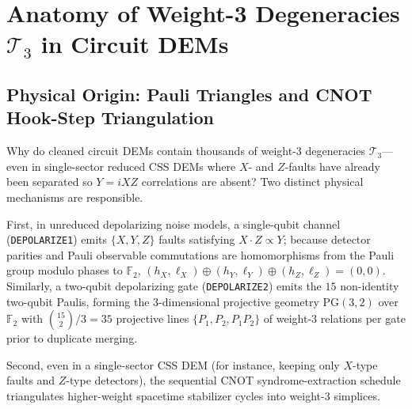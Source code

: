 \documentclass[12pt]{article}
\theoremstyle{definition}
\newcommand{\Ftwo}{\mathbb{F}_2}
\newcommand{\Tc}{\mathcal{T}_3}
\newcommand{\ttt}[1]{\texttt{#1}}
\begin{document}
\section{Anatomy of Weight-3 Degeneracies \texorpdfstring{$\Tc$}{T3} in Circuit DEMs}\label{sec:anatomy}

\subsection{Physical Origin: Pauli Triangles and CNOT Hook-Step Triangulation}\label{subsec:origin}

Why do cleaned circuit DEMs contain thousands of weight-3 degeneracies $\Tc$---even in single-sector reduced CSS
DEMs where $X$- and $Z$-faults have already been separated so $Y = iXZ$ correlations are absent? Two distinct
physical mechanisms are responsible.

First, in unreduced depolarizing noise models, a single-qubit channel (\ttt{DEPOLARIZE1}) emits $\{X, Y,
Z\}$ faults satisfying $X \cdot Z \propto Y$; because detector parities and Pauli observable commutations are
homomorphisms from the Pauli group modulo phases to $\Ftwo$, $(h_X, \ell_X) \oplus (h_Y, \ell_Y) \oplus (h_Z,
\ell_Z) = (0, 0)$. Similarly, a two-qubit depolarizing gate (\ttt{DEPOLARIZE2}) emits the $15$ non-identity
two-qubit Paulis, forming the $3$-dimensional projective geometry $\mathrm{PG}(3, 2)$ over $\Ftwo$ with
$\binom{15}{2}/3 = 35$ projective lines $\{P_1, P_2, P_1 P_2\}$ of weight-3 relations per gate prior to duplicate
merging.

Second, even in a single-sector CSS DEM (for instance, keeping only $X$-type faults and $Z$-type detectors), the
sequential CNOT syndrome-extraction schedule triangulates higher-weight spacetime stabilizer cycles into weight-3
simplices.
\end{document}
